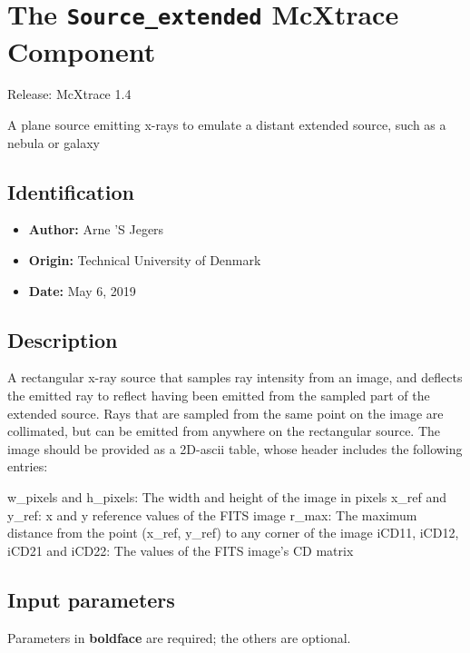 \section{The \texttt{Source\_extended} McXtrace Component}
Release: McXtrace 1.4

A plane source emitting x-rays to emulate a distant extended source, such as a
nebula or galaxy

\subsection*{Identification}
\begin{itemize}
  \item \textbf{Author:} Arne 'S Jegers
  \item \textbf{Origin:} Technical University of Denmark
  \item \textbf{Date:} May 6, 2019
\end{itemize}

\subsection*{Description}
A rectangular x-ray source that samples ray intensity from an image, and deflects the emitted ray to reflect having been emitted from the sampled part of the extended source. Rays that are sampled from the same point on the image are collimated, but can be emitted from anywhere on the rectangular source. The image should be provided as a 2D-ascii table, whose header includes the following entries:

w\_pixels and h\_pixels: The width and height of the image in pixels x\_ref and y\_ref: x and y reference values of the FITS image r\_max: The maximum distance from the point (x\_ref, y\_ref) to any corner of the image iCD11, iCD12, iCD21 and iCD22: The values of the FITS image's CD matrix

\subsection*{Input parameters}
Parameters in \textbf{boldface} are required; the others are optional.

